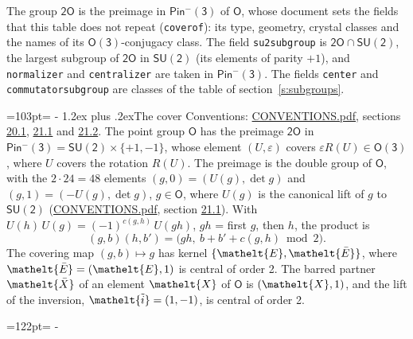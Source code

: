 \documentclass[10pt,a4paper]{article}
\makeatletter
\renewcommand\section{\@startsection{section}{1}{\z@}{-3ex plus -1ex minus -.2ex}%
  {1.2ex plus .2ex}{\normalfont\large\sffamily\bfseries\color{parttitle}}}
\newcommand{\needspace}[1]{\par\penalty-100\begingroup\dimen0=#1\relax\dimen2=\pagegoal
  \advance\dimen2-\pagetotal\ifdim\dimen0>\dimen2\relax\ifdim\dimen2>0pt\vfil\break\fi\fi
  \endgroup}
\numberwithin{equation}{section}
\newcommand{\eltfont}[1]{{\let\sigma\eltsigma\mathelt{#1}}}
\newcommand{\grp}[1]{\mathsf{#1}}
\newcommand{\elt}[1]{\eltfont{#1}}
\newcommand{\dirprod}{\times}
\newcommand{\barred}[1]{\bar{#1}}
\newcommand{\lift}[1]{\tilde{#1}}
\makeatother
\begin{document}
\leavevmode\label{n:element.inversion}\label{n:group.preimage}The group $\grp{2O}$ is the preimage in $\grp{Pin^{-}(3)}$ of \href{../../../rotation/data/pdf/O.pdf}{$\grp{O}$}, whose document sets the fields that this table does not repeat (\texttt{coverof}): its type, geometry, crystal classes and the names of its \href{../../../rotation/data/pdf/O3.pdf}{$\grp{O(3)}$}-conjugacy class. The field \texttt{su2subgroup} is $\grp{2O} \cap \grp{SU(2)}$, the largest subgroup of $\grp{2O}$ in $\grp{SU(2)}$ (its elements of parity $+1$), and \texttt{normalizer} and \texttt{centralizer} are taken in $\grp{Pin^{-}(3)}$. The fields \texttt{center} and \texttt{commutatorsubgroup} are classes of the table of section~\ref{s:subgroups}.
\needspace{103pt}
\section{The cover}\label{s:cover}
Conventions: \href{../../CONVENTIONS.pdf}{CONVENTIONS.pdf}, sections \href{../../CONVENTIONS.pdf\#conv.20.1}{20.1}, \href{../../CONVENTIONS.pdf\#conv.21.1}{21.1} and \href{../../CONVENTIONS.pdf\#conv.21.2}{21.2}.
\leavevmode\label{n:group.pin.minus}\label{n:group.su2}\label{n:local.pin.sign}\label{n:matrix.covered}\label{n:matrix.lift.su2}\label{n:index.bar}The point group $\grp{O}$ has the preimage $\grp{2O}$ in $\grp{Pin^{-}(3)} = \grp{SU(2)} \dirprod \{+1, -1\}$, whose element $(U, \varepsilon)$ covers $\varepsilon R(U) \in \grp{O(3)}$, where $U$ covers the rotation $R(U)$. The preimage is the double group of $\grp{O}$, with the $2 \cdot 24 = 48$ elements $(g, 0) = (U(g), \det g)$ and $(g, 1) = (-U(g), \det g)$, $g \in \grp{O}$, where $U(g)$ is the canonical lift of $g$ to $\grp{SU(2)}$ (\href{../../CONVENTIONS.pdf}{CONVENTIONS.pdf}, section \href{../../CONVENTIONS.pdf\#conv.21.1}{21.1}). \label{n:function.cocycle}With $U(h)\,U(g) = (-1)^{c(g,h)}\,U(gh)$, $gh$ = first $g$, then $h$, the product is
\begin{equation}\label{e:product}(g, b)(h, b') = \bigl(gh,\ b + b' + c(g, h) \bmod 2\bigr).\end{equation}
\leavevmode\label{n:mark.bar}The covering map $(g, b) \mapsto g$ has kernel $\{\elt{E}, \elt{\barred{E}}\}$, where $\elt{\barred{E}} = (\elt{E}, 1)$ is central of order 2. \label{n:element.named}\label{n:mark.lift}The barred partner $\elt{\barred{X}}$ of an element $\elt{X}$ of $\grp{O}$ is $(\elt{X}, 1)$, and the lift of the inversion, $\elt{\lift{i}} = (1, -1)$, is central of order 2.
\needspace{122pt}
\end{document}
